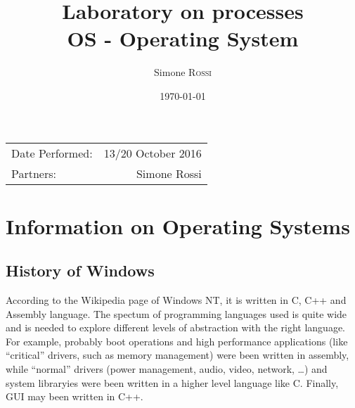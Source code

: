 \documentclass{article}
\title{Laboratory on processes\\ OS - Operating System} %
\author{Simone \textsc{Rossi}} %
\date{\today} %
\begin{document}
\maketitle %

\begin{center}
\begin{tabular}{l r}
Date Performed: & 13/20 October 2016 \\ %
Partners: & Simone Rossi \\ %
\end{tabular}
\end{center}



\section{Information on Operating Systems}
\subsection{History of Windows}
According to the Wikipedia page of Windows NT, it is written in C, C++ and Assembly language.
The spectum of programming languages used is quite wide and is needed to explore different 
levels of abstraction with the right language. For example, probably boot operations and high 
performance applications (like ``critical'' drivers, such as memory management) were been written
in assembly, while ``normal'' drivers (power management, audio, video, network, \dots) and system
libraryies were been written in a higher level language like C. Finally, GUI may been written in
C++.  
\end{document}
